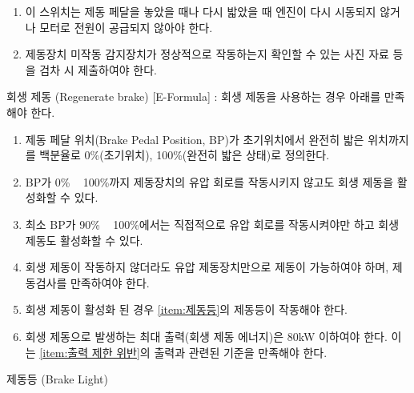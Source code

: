 \documentclass[final,a4paper,10pt]{report}
\begin{document}
\begin{enumerate}
\begin{enumerate}
      \item\label{rule:formula-technical.brake-system.bots.no-auto-restart} 이 스위치는 제동 페달을 놓았을 때나 다시 밟았을 때 엔진이 다시 시동되지 않거나 모터로 전원이 공급되지 않아야 한다.
      \item\label{rule:formula-technical.brake-system.bots.photo-evidence-submission} 제동장치 미작동 감지장치가 정상적으로 작동하는지 확인할 수 있는 사진 자료 등을 검차 시 제출하여야 한다.
    \end{enumerate}

  {\color{blue}
  \item\label{rule:formula-technical.brake-system.regenerative-braking} 회생 제동 (Regenerate brake) [E-Formula] : 회생 제동을 사용하는 경우 아래를 만족해야 한다.
  \begin{enumerate}
    \item\label{rule:formula-technical.brake-system.regenerative-braking.bp-definition} 제동 페달 위치(Brake Pedal Position, BP)가 초기위치에서 완전히 밟은 위치까지를 백분율로 0\%(초기위치), 100\%(완전히 밟은 상태)로 정의한다.
    \item\label{rule:formula-technical.brake-system.regenerative-braking.regen-without-hydraulic-actuation} BP가 0\% \string~ 100\%까지 제동장치의 유압 회로를 작동시키지 않고도 회생 제동을 활성화할 수 있다.
    \item\label{rule:formula-technical.brake-system.regenerative-braking.hydraulic-active-above-90pct} 최소 BP가 90\% \string~ 100\%에서는 직접적으로 유압 회로를 작동시켜야만 하고 회생 제동도 활성화할 수 있다.
    \item\label{rule:formula-technical.brake-system.regenerative-braking.hydraulic-only-fallback} 회생 제동이 작동하지 않더라도 유압 제동장치만으로 제동이 가능하여야 하며, 제동검사를 만족하여야 한다.
    \item\label{rule:formula-technical.brake-system.regenerative-braking.brake-light-during-regen} 회생 제동이 활성화 된 경우 \ref{item:제동등}의 제동등이 작동해야 한다.
    \item\label{rule:formula-technical.brake-system.regenerative-braking.max-regen-power-80kw} 회생 제동으로 발생하는 최대 출력(회생 제동 에너지)은 80kW 이하여야 한다. 이는 \ref{item:출력 제한 위반}의 출력과 관련된 기준을 만족해야 한다.
  \end{enumerate}}
  \item 제동등 (Brake Light) \label{item:제동등}\label{rule:formula-technical.brake-light}
    \begin{enumerate}

\end{enumerate}
\end{enumerate}
\end{document}
